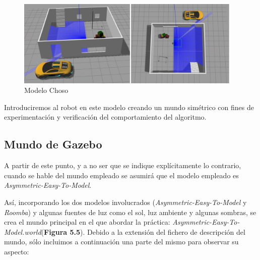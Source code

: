 \begin{figure}[H]
  \begin{center}
    \includegraphics[width=0.96\textwidth]{figures/chosoworld.png}
		\caption{Modelo Choso}
		\label{fig.choso}
		\end{center}
\end{figure}

Introduciremos al robot en este modelo creando un mundo simétrico con fines de experimentación y verificación del comportamiento del algoritmo.

\subsection{Mundo de Gazebo}
A partir de este punto, y a no ser que se indique explícitamente lo contrario, cuando se hable del mundo empleado se asumirá que el modelo empleado es \textit{Asymmetric-Easy-To-Model}.

Así, incorporando los dos modelos involucrados (\textit{Asymmetric-Easy-To-Model} y \textit{Roomba}) y algunas fuentes de luz como el sol, luz ambiente y algunas sombras, se crea el mundo principal en el que abordar la práctica: \textit{Asymmetric-Easy-To-Model.world}(\textbf{Figura 5.5}). Debido a la extensión del fichero de descripción del mundo, sólo incluimos a continuación una parte del mismo para observar su aspecto:

